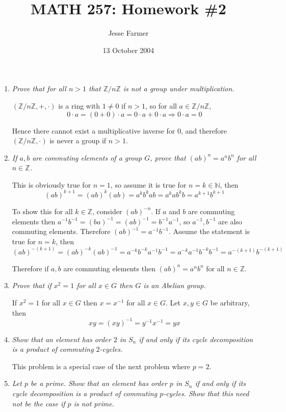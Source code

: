\documentclass[letterpaper, 11pt]{article}
\title{MATH 257: Homework \#2}
\author{Jesse Farmer}
\date{13 October 2004}
\begin{document}
\maketitle
\begin{enumerate}
\item \emph{Prove that for all $n > 1$ that $\mathbb{Z}/n\mathbb{Z}$ is not a group under multiplication.}

$(\mathbb{Z}/n\mathbb{Z},+,\cdot)$ is a ring with $1 \neq 0$ if $n > 1$, so for all $a \in \mathbb{Z}/n\mathbb{Z}$,
\[
0\cdot a = (0+0)\cdot a = 0\cdot a + 0\cdot a \Rightarrow 0\cdot a = 0 
\]

Hence there cannot exist a multiplicative inverse for $0$, and therefore $(\mathbb{Z}/n\mathbb{Z},\cdot)$ is never a group if $n > 1$.
\item \emph{If $a,b$ are commuting elements of a group $G$, prove that $(ab)^n = a^nb^n$ for all $n \in \mathbb{Z}$.}

This is obviously true for $n=1$, so assume it is true for $n = k \in \mathbb{N}$, then
\[
(ab)^{k+1} = (ab)^k(ab) = a^kb^kab = a^kab^kb = a^{k+1}b^{k+1}
\]

To show this for all $k \in \mathbb{Z}$, consider $(ab)^{-n}$.  If $a$ and $b$ are commuting elements then $a^{-1}b^{-1} = (ba)^{-1} = (ab)^{-1} = b^{-1}a^{-1}$, so $a^{-1}, b^{-1}$ are also commuting elements.  Therefore $(ab)^{-1} = a^{-1}b^{-1}$.  Assume the statement is true for $n = k$, then
\[
(ab)^{-(k+1)} = (ab)^{-k}(ab)^{-1} = a^{-k}b^{-k}a^{-1}b^{-1} = a^{-k}a^{-1}b^{-k}b^{-1} = a^{-(k+1)}b^{-(k+1)}
\]

Therefore if $a,b$ are commuting elements then $(ab)^n = a^nb^n$ for all $n \in \mathbb{Z}$.

\item \emph{Prove that if $x^2 = 1$ for all $x \in G$ then $G$ is an Abelian group.}

If $x^2 = 1$ for all $x \in G$ then $x = x^{-1}$ for all $x \in G$.  Let $x,y \in G$ be arbitrary, then
\[
xy = (xy)^{-1} = y^{-1}x^{-1} = yx
\]
\item \emph{Show that an element has order $2$ in $S_n$ if and only if its cycle decomposition is a product of commuting $2$-cycles.}

This problem is a special case of the next problem where $p=2$.

\item \emph{Let $p$ be a prime.  Show that an element has order $p$ in $S_n$ if and only if its cycle decomposition is a product of commuting $p$-cycles.  Show that this need not be the case if $p$ is not prime.}


\end{enumerate}
\end{document}
